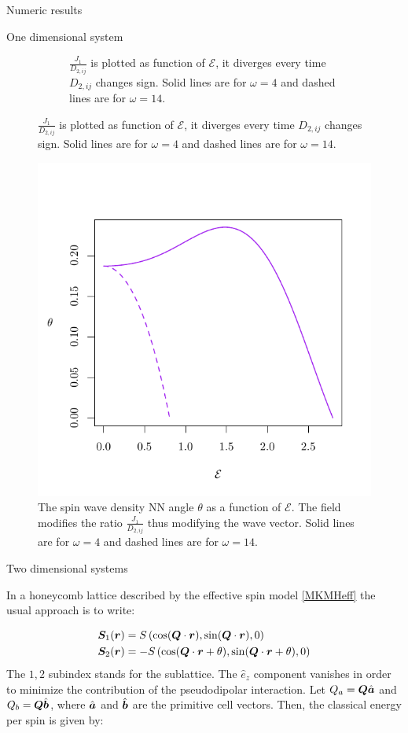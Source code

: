 \begin{section}{Numeric results}
\begin{subsection}{One dimensional system}
\begin{figure}
\begin{subfigure}{.5\textwidth}
  \caption{$\frac{J_{1}}{D_{2,ij}}$ is plotted as function of $\mathcal{E}$, it diverges every time $D_{2,ij}$ changes sign. Solid lines are for $\omega = 4$ and dashed lines are for $\omega = 14$.}
  \label{Fig3.1:ratio}
\end{subfigure}
\label{Fig3.1}
\end{figure}

\begin{figure}
\centering
  \includegraphics[width=0.5\linewidth]{Figures/theta.pdf}
  \caption{The spin wave density NN angle $\theta$ as a function of $\mathcal{E}$. The field modifies the ratio $\frac{J_{1}}{D_{2,ij}}$ thus modifying the wave vector. Solid lines are for $\omega = 4$ and dashed lines are for $\omega = 14$.}
\label{Fig3.2}
\end{figure}

\end{subsection}

\begin{subsection}{Two dimensional systems}
 
In a honeycomb lattice described by the effective spin model \ref{MKMHeff} the usual approach is to write:

\begin{align}
\boldsymbol{S}_1(\boldsymbol{r}) &= S\left( \cos(\boldsymbol{Q}\cdot\boldsymbol{r}), \sin(\boldsymbol{Q}\cdot\boldsymbol{r}), 0 \right) \\
\boldsymbol{S}_2(\boldsymbol{r}) &= -S\left( \cos(\boldsymbol{Q}\cdot\boldsymbol{r} + \theta), \sin(\boldsymbol{Q}\cdot\boldsymbol{r} + \theta), 0 \right)
\end{align}
The $1, 2$ subindex stands for the sublattice. The $\hat{e}_z$ component vanishes in order to minimize the contribution of the pseudodipolar interaction. Let $Q_a = \boldsymbol{Q}\hat{\boldsymbol{a}}$ and $Q_b = \boldsymbol{Q}\hat{\boldsymbol{b}}$, where $\hat{\boldsymbol{a}}$ and $\hat{\boldsymbol{b}}$ are the primitive cell vectors. Then, the classical energy per spin is given by:


\end{subsection}
\end{section}
